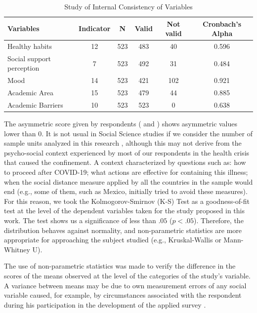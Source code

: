 \documentclass[english]{textolivre}
\begin{document}
\begin{table}[h!]
\centering
\begin{threeparttable}
\caption{Study of Internal Consistency of Variables}
\label{Table04}
\begin{tabular}{lccccc}
\toprule
Variables & Indicator & N & Valid & Not valid & Cronbach's Alpha \\
\midrule
Healthy habits & 12 & 523 & 483 & 40 & 0.596 \\
Social support perception & 7 & 523 & 492 & 31 & 0.484 \\
Mood & 14 & 523 & 421 & 102 & 0.921 \\
Academic Area & 15 & 523 & 479 & 44 & 0.885 \\
Academic Barriers & 10 & 523 & 523& 0 & 0.638 \\
\bottomrule
\end{tabular}
\end{threeparttable}
\end{table}

The asymmetric score given by respondents ( and ) shows asymmetric values lower than 0. It is not usual in Social Science studies if we consider the number of sample units analyzed in this research \cite{rubio_hurtado_como_2012}, although this may not derive from the psycho-social context experienced by most of our respondents in the health crisis that caused the confinement. A context characterized by questions such as: how to proceed after COVID-19; what actions are effective for containing this illness; when the social distance measure applied by all the countries in the sample would end (e.g., some of them, such as Mexico, initially tried to avoid these measures). For this reason, we took the Kolmogorov-Smirnov (K-S) Test as a goodness-of-fit test at the level of the dependent variables taken for the study proposed in this work. The test shows us a significance of less than $.05$ ($p<.05$). Therefore, the distribution behaves against normality, and non-parametric statistics are more appropriate for approaching the subject studied (e.g., Kruskal-Wallis or Mann-Whitney U).

The use of non-parametric statistics was made to verify the difference in the scores of the means observed at the level of the categories of the study's variable. A variance between means may be due to own measurement errors of any social variable caused, for example, by circumstances associated with the respondent during his participation in the development of the applied survey \cite{urdanibia_error_2009}.
\end{document}
